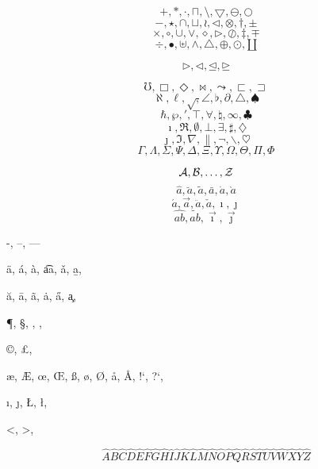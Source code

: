 
$$+, \ast, \cdot, \sqcap, \setminus, \bigtriangledown, \ominus, \bigcirc$$
$$-, \star, \cap, \sqcup, \wr, \triangleleft,
\otimes, \dagger, \pm$$
$$\times, \circ, \cup, \vee, \diamond, \triangleright, \oslash,
\ddagger, \mp$$
$$\div, \bullet, \uplus, \wedge, \bigtriangleup, \oplus, \odot, \amalg$$

$$\rhd, \lhd, \unlhd, \unrhd$$


$$\mho, \Box, \Diamond, \Join, \leadsto, \sqsubset, \sqsupset$$
$$\aleph, \ell, \surd, \angle, \flat, \partial, \triangle, \spadesuit$$
$$\hbar, \wp, \prime, \top, \forall, \natural, \infty, \clubsuit$$
$$\imath, \Re, \emptyset, \bot, \exists, \sharp, \diamondsuit$$
$$\jmath, \Im, \nabla, \|, \neg, \backslash, \heartsuit$$
$$\Gamma, \Lambda, \Sigma, \Psi, \Delta, \Xi, \Upsilon, \Omega, \Theta,
\Pi, \Phi$$


$${\cal A}, {\cal B}, \ldots, {\cal Z}$$
$$\hat{a}, \breve{a}, \tilde{a}, \bar{a}, \dot{a}, \grave{a}$$
$$\acute{a},\vec{a}, \ddot{a}, \check{a}, \imath, \jmath$$
$$\widehat{ab}, \widetilde{ab}, \vec{\imath}, \vec{\jmath}$$


-, --, ---

\"{a}, \'{a}, \`{a}, \t{aa}, \v{a}, \b{a}, 

\u{a}, \={a}, \~{a}, \.{a}, \H{a}, \c{a}, 

\P, \S, \dag, \ddag, %

\copyright, \pounds,	%

\ae, \AE, \oe, \OE, \ss, \o, \O, \aa, \AA, !`, ?`, 

\i, \j, \L, \l,			%

<, >, 



$$
\hat{A}
\hat{B}
\hat{C}
\hat{D}
\hat{E}
\hat{F}
\hat{G}
\hat{H}
\hat{I}
\hat{J}
\hat{K}
\hat{L}
\hat{M}
\hat{N}
\hat{O}
\hat{P}
\hat{Q}
\hat{R}
\hat{S}
\hat{T}
\hat{U}
\hat{V}
\hat{W}
\hat{X}
\hat{Y}
\hat{Z}
$$

